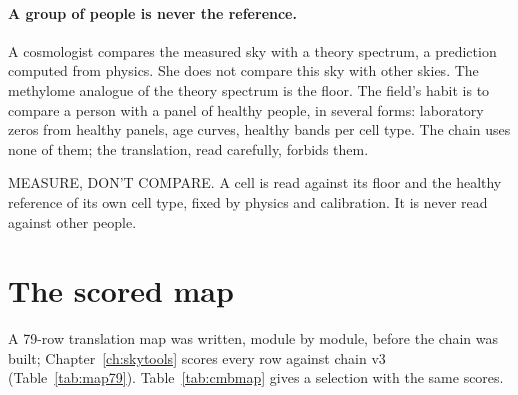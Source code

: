 \paragraph{A group of people is never the reference.} A cosmologist compares the measured sky with a theory spectrum, a prediction
computed from physics. She does not compare this sky with other skies. The methylome analogue of the theory spectrum is the floor.
The field's habit is to compare a person with a panel of healthy people, in several forms: laboratory zeros from healthy
panels, age curves, healthy bands per cell type. The chain uses none of them; the translation, read carefully, forbids them.

\begin{rulebox}
MEASURE, DON'T COMPARE. A cell is read against its floor and the healthy reference of its own cell type, fixed by physics and calibration. It is
never read against other people.
\end{rulebox}

\section{The scored map}

A 79-row translation map was written, module by module, before the chain was built; Chapter~\ref{ch:skytools} scores
every row against chain v3 (Table~\ref{tab:map79}). Table~\ref{tab:cmbmap} gives a selection with the same scores.

